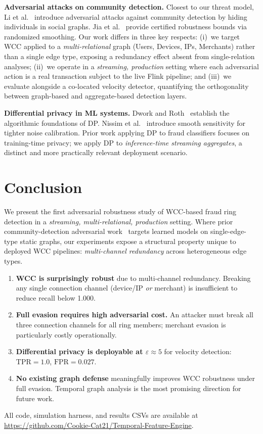 \documentclass[sigconf,nonacm]{acmart}
\newcommand{\wcc}{\textsc{WCC}\xspace}
\newcommand{\eps}{\varepsilon}
\begin{document}
\noindent\textbf{Adversarial attacks on community detection.}
Closest to our threat model, Li et al.~\cite{li2020adversarial} introduce
adversarial attacks against community detection by hiding individuals in
social graphs.  Jia et al.~\cite{jia2020certified} provide certified
robustness bounds via randomized smoothing.  Our work differs in three
key respects: (i)~we target \wcc applied to a \emph{multi-relational}
graph (Users, Devices, IPs, Merchants) rather than a single edge type,
exposing a redundancy effect absent from single-relation analyses;
(ii)~we operate in a \emph{streaming, production} setting where each
adversarial action is a real transaction subject to the live Flink
pipeline; and (iii)~we evaluate alongside a co-located velocity detector,
quantifying the orthogonality between graph-based and aggregate-based
detection layers.

\noindent\textbf{Differential privacy in ML systems.}
Dwork and Roth~\cite{dwork2014} establish the algorithmic foundations of DP.
Nissim et al.~\cite{nissim2007} introduce smooth sensitivity for tighter
noise calibration.  Prior work applying DP to fraud classifiers focuses on
training-time privacy; we apply DP to \emph{inference-time streaming
aggregates}, a distinct and more practically relevant deployment scenario.

\section{Conclusion}

We present the first adversarial robustness study of \wcc-based fraud ring
detection in a \emph{streaming, multi-relational, production} setting.
Where prior community-detection adversarial work~\cite{li2020adversarial,
jia2020certified} targets learned models on single-edge-type static graphs,
our experiments expose a structural property unique to deployed \wcc
pipelines: \emph{multi-channel redundancy} across heterogeneous edge types.

\begin{enumerate}
  \item \textbf{\wcc is surprisingly robust} due to multi-channel redundancy.
        Breaking any single connection channel (device/IP \emph{or} merchant)
        is insufficient to reduce recall below 1.000.
  \item \textbf{Full evasion requires high adversarial cost.}  An attacker
        must break all three connection channels for all ring members;
        merchant evasion is particularly costly operationally.
  \item \textbf{Differential privacy is deployable at $\eps \approx 5$}
        for velocity detection: $\mathrm{TPR} = 1.0$, $\mathrm{FPR} = 0.027$.
  \item \textbf{No existing graph defense} meaningfully improves \wcc
        robustness under full evasion.  Temporal graph analysis is the most
        promising direction for future work.
\end{enumerate}

All code, simulation harness, and results CSVs are available at
\url{https://github.com/Cookie-Cat21/Temporal-Feature-Engine}.



\end{document}
